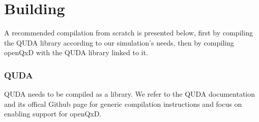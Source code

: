 \chapter{Building}
\label{ch:p1:building}






A recommended compilation from scratch is presented below, first by compiling the QUDA library according to our simulation's needs, then by compiling openQxD with the QUDA library linked to it.

\subsection{QUDA}
\label{sec:building:quda}

QUDA needs to be compiled as a library. We refer to the QUDA documentation \cite{QUDApaper} and its offical Github page \cite{github:quda} for generic compilation instructions and focus on enabling support for openQxD.


